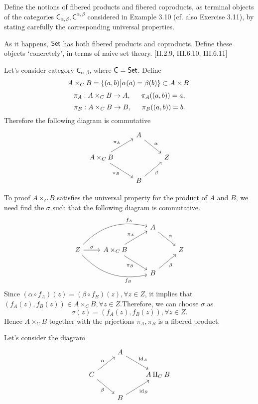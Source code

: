 \begin{problem}[5.12]
  Define the notions of fibered products and fibered coproducts, as terminal objects of the categories $\mathsf{C}_{\alpha,\beta},\mathsf{C}^{\alpha,\beta}$ considered in
  Example 3.10 (cf. also Exercise 3.11), by stating carefully the corresponding
  universal properties.

  As it happens, $\mathsf{Set}$ has both fibered products and coproducts. Define these
  objects `concretely', in terms of naive set theory. [II.2.9, III.6.10, III.6.11]
\end{problem}

\begin{solution}
Let's consider category $\mathsf{C}_{\alpha,\beta}$, where $\mathsf{C} = \mathsf{Set}$. Define 
$$A\times_{C} B = \{(a,b) \big{|} \alpha(a) = \beta(b)\}\subset A \times B.$$
$$\pi_A: A\times_{C} B \to A, \indent \pi_A((a,b)) = a,$$
$$\pi_B: A\times_{C} B \to B, \indent \pi_B((a,b)) = b.$$
Therefore the following diagram is commutative
%
\[
\begin{tikzcd}
& A \arrow[dr, "\alpha"]& \\
A\times_C B \arrow[ur, "\pi_A"] \arrow[dr, "\pi_B"'] & & Z\\
& B \arrow[ur, "\beta"'] &
\end{tikzcd}
\]

To proof $A\times_C B$ satisfies the universal property for the product of $A$ and $B$, we need 
find the $\sigma$ such that the following diagram is commutative.
%
\[
\begin{tikzcd}
& & A \arrow[dr, "\alpha"]& \\
Z\arrow[r, "\sigma"] \arrow[urr, bend left, "f_A" near end] \arrow[drr, bend right, "f_B"' near end] &A\times_C B \arrow[ur, "\pi_A"] \arrow[dr, "\pi_B"'] & & Z\\
&& B \arrow[ur, "\beta"'] &
\end{tikzcd}
\]
Since $(\alpha\circ f_A)(z) = (\beta\circ f_B)(z), \forall z\in Z$, it implies that $(f_A(z), f_B(z))\in A\times_C B,\forall z\in Z$.Therefore, we can choose $\sigma$ as $$\sigma(z) = (f_A(z), f_B(z)), \forall z\in Z.$$
Hence $A\times_C B$ together with the prjections $\pi_A,\pi_B$ is a fibered product.

Let's consider the diagram
%	
\[
\begin{tikzcd}
& A \arrow[dr, "\text{id}_A"]& \\
C  \arrow[ur, "\alpha"] \arrow[dr, "\beta"'] & & A\amalg_{C} B\\
& B \arrow[ur, "\text{id}_B"'] &
\end{tikzcd}
\]


\end{solution}

